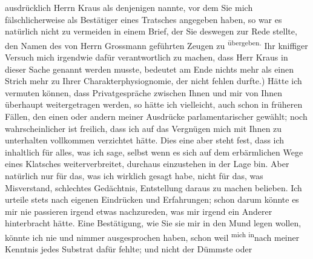 \begin{ledgroupsized}[t]{13cm}
               ausdrücklich Herrn Kraus als denjenigen nannte,
               vor dem Sie mich fälschlicherweise als Bestätiger eines Tratsches angegeben haben, so
               war es natürlich nicht zu vermeiden in einem Brief, der Sie deswegen zur Rede
               stellte, den Namen des von Herrn Grossmann
               geführten Zeugen zu \substVorne{}\textsuperscript{übergeben.}{\allowbreak}\substDazwischen{}\label{T_L02019_1v}\label{T_L02019_1h}\substHinten{}\pend
           \pstart
           Ihr kniffiger Versuch mich irgendwie dafür verantwortlich zu machen, dass Herr Kraus in dieser Sache genannt werden musste,
               bedeutet am Ende nichts mehr als einen Strich mehr zu Ihrer Charakterphysiognomie,
               der nicht fehlen durfte.) Hätte ich vermuten können, dass Privatgespräche zwischen
               Ihnen und mir von Ihnen überhaupt weitergetragen werden, so hätte ich vielleicht,
               auch schon in früheren Fällen, den einen oder
               andern meiner Ausdrücke parlamentarischer gewählt; noch wahrscheinlicher ist
               freilich, dass ich auf das Vergnügen mich mit Ihnen zu unterhalten vollkommen
               verzichtet hätte. Dies eine aber steht fest, dass ich inhaltlich für alles, was ich
               sage, selbst wenn es {\pb}sich auf dem erbärmlichen Wege eines
               Klatsches weiterverbreitet, durchaus einzustehen in der Lage bin. Aber natürlich nur
               für das, was ich wirklich gesagt habe, nicht für das, was Misverstand, schlechtes
               Gedächtnis, Entstellung daraus zu machen belieben. Ich urteile stets nach eigenen
               Eindrücken und Erfahrungen; schon darum könnte es mir nie passieren irgend etwas
               nachzureden, was mir irgend ein Anderer hinterbracht hätte. Eine Bestätigung, wie Sie
               sie mir in den Mund legen wollen, könnte ich nie und nimmer ausgesprochen haben,
               schon weil \substVorne{}\textsuperscript{mich in}{\allowbreak}\substDazwischen{}nach\substHinten{} meiner Kenntnis jedes Substrat dafür fehlte; und nicht der Dümmste oder

\end{ledgroupsized}

